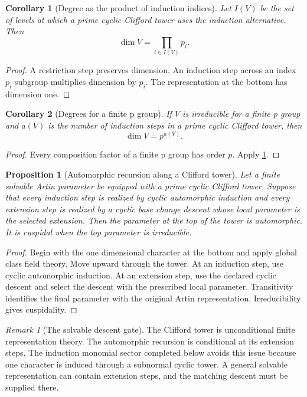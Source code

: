 \documentclass{aomart}
\newtheorem{proposition}[proposition]{Proposition}
\newtheorem{corollary}[corollary]{Corollary}
\theoremstyle{definition}
\theoremstyle{remark}
\newtheorem{remark}[remark]{Remark}
\begin{document}
\begin{corollary}[Degree as the product of induction indices]\label{cor:solvable_degree_product}
Let \(I(V)\) be the set of levels at which a prime cyclic Clifford tower uses the induction alternative. Then
\[
\boxed{
\dim V
=
\prod_{i\in I(V)}p_i.
}
\]
\end{corollary}

\begin{proof}
A restriction step preserves dimension. An induction step across an index \(p_i\) subgroup multiplies dimension by \(p_i\). The representation at the bottom has dimension one.
\end{proof}

\begin{corollary}[Degrees for a finite p group]\label{cor:p_power_degree}
If \(V\) is irreducible for a finite p group and \(a(V)\) is the number of induction steps in a prime cyclic Clifford tower, then
\[
\boxed{
\dim V=p^{a(V)}.
}
\]
\end{corollary}

\begin{proof}
Every composition factor of a finite p group has order \(p\). Apply \cref{cor:solvable_degree_product}.
\end{proof}

\begin{proposition}[Automorphic recursion along a Clifford tower]\label{prop:clifford_automorphic_recursion}
Let a finite solvable Artin parameter be equipped with a prime cyclic Clifford tower. Suppose that every induction step is realized by cyclic automorphic induction and every extension step is realized by a cyclic base change descent whose local parameter is the selected extension. Then the parameter at the top of the tower is automorphic. It is cuspidal when the top parameter is irreducible.
\end{proposition}

\begin{proof}
Begin with the one dimensional character at the bottom and apply global class field theory. Move upward through the tower. At an induction step, use cyclic automorphic induction. At an extension step, use the declared cyclic descent and select the descent with the prescribed local parameter. Transitivity identifies the final parameter with the original Artin representation. Irreducibility gives cuspidality.
\end{proof}

\begin{remark}[The solvable descent gate]\label{rem:solvable_descent_gate}
The Clifford tower is unconditional finite representation theory. The automorphic recursion is conditional at its extension steps. The induction monomial sector completed below avoids this issue because one character is induced through a subnormal cyclic tower. A general solvable representation can contain extension steps, and the matching descent must be supplied there.
\end{remark}
\end{document}
